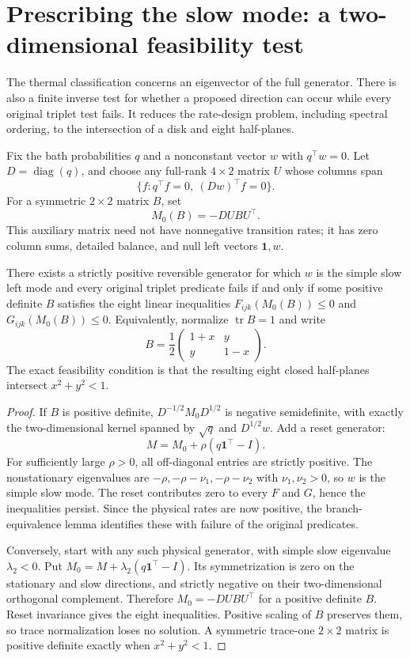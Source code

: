 \section{Prescribing the slow mode: a two-dimensional feasibility test}\label{sec:realizability}
The thermal classification concerns an eigenvector of the full generator.
There is also a finite inverse test for whether a proposed direction can occur
while every original triplet test fails. It reduces the rate-design problem,
including spectral ordering, to the intersection of a disk and eight half-planes.

Fix the bath probabilities $q$ and a nonconstant vector $w$ with $q^\top w=0$.
Let $D=\operatorname{diag}(q)$, and choose any full-rank $4\times2$ matrix $U$
whose columns span
\[
\{f:q^\top f=0,\ (Dw)^\top f=0\}.
\]
For a symmetric $2\times2$ matrix $B$, set
\[
M_0(B)=-DU B U^\top.
\]
This auxiliary matrix need not have nonnegative transition rates; it has
zero column sums, detailed balance, and null left vectors $\mathbf1,w$.

\begin{theorem}\label{thm:inversefeasibility}
There exists a strictly positive reversible generator for which $w$ is the
simple slow left mode and every original triplet predicate fails if and only
if some positive definite $B$ satisfies the eight linear inequalities
$F_{ijk}(M_0(B))\leq0$ and $G_{ijk}(M_0(B))\leq0$.
Equivalently, normalize $\operatorname{tr}B=1$ and write
\[
B=\frac12\begin{pmatrix}1+x&y\\y&1-x\end{pmatrix}.
\]
The exact feasibility condition is that the resulting eight closed
half-planes intersect $x^2+y^2<1$.
\end{theorem}
\begin{proof}
If $B$ is positive definite, $D^{-1/2}M_0D^{1/2}$ is negative semidefinite,
with exactly the two-dimensional kernel spanned by $\sqrt q$ and
$D^{1/2}w$. Add a reset generator:
\[
M=M_0+\rho(q\mathbf1^\top-I).
\]
For sufficiently large $\rho>0$, all off-diagonal entries are strictly
positive. The nonstationary eigenvalues are $-\rho,-\rho-\nu_1,
-\rho-\nu_2$ with $\nu_1,\nu_2>0$, so $w$ is the simple slow mode.
The reset contributes zero to every $F$ and $G$, hence the inequalities
persist. Since the physical rates are now positive, the branch-equivalence
lemma identifies these with failure of the original predicates.

Conversely, start with any such physical generator, with simple slow
eigenvalue $\lambda_2<0$. Put
$M_0=M+\lambda_2(q\mathbf1^\top-I)$. Its symmetrization is zero on the
stationary and slow directions, and strictly negative on their two-dimensional
orthogonal complement. Therefore $M_0=-DU B U^\top$ for a positive definite
$B$. Reset invariance gives the eight inequalities. Positive scaling of $B$
preserves them, so trace normalization loses no solution. A symmetric trace-one
$2\times2$ matrix is positive definite exactly when $x^2+y^2<1$.
\end{proof}

